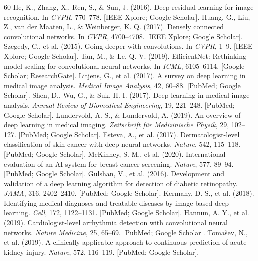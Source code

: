 \documentclass[10pt,a4paper]{article}
\begin{document}
\begin{thebibliography}{60}
 He, K., Zhang, X., Ren, S., \& Sun, J. (2016). Deep residual learning for image recognition. In \textit{CVPR}, 770--778. [IEEE Xplore; Google Scholar].
 Huang, G., Liu, Z., van der Maaten, L., \& Weinberger, K. Q. (2017). Densely connected convolutional networks. In \textit{CVPR}, 4700--4708. [IEEE Xplore; Google Scholar].
 Szegedy, C., et al. (2015). Going deeper with convolutions. In \textit{CVPR}, 1--9. [IEEE Xplore; Google Scholar].
 Tan, M., \& Le, Q. V. (2019). EfficientNet: Rethinking model scaling for convolutional neural networks. In \textit{ICML}, 6105--6114. [Google Scholar; ResearchGate].
 Litjens, G., et al. (2017). A survey on deep learning in medical image analysis. \textit{Medical Image Analysis}, 42, 60--88. [PubMed; Google Scholar].
 Shen, D., Wu, G., \& Suk, H.-I. (2017). Deep learning in medical image analysis. \textit{Annual Review of Biomedical Engineering}, 19, 221--248. [PubMed; Google Scholar].
 Lundervold, A. S., \& Lundervold, A. (2019). An overview of deep learning in medical imaging. \textit{Zeitschrift für Medizinische Physik}, 29, 102--127. [PubMed; Google Scholar].
 Esteva, A., et al. (2017). Dermatologist-level classification of skin cancer with deep neural networks. \textit{Nature}, 542, 115--118. [PubMed; Google Scholar].
 McKinney, S. M., et al. (2020). International evaluation of an AI system for breast cancer screening. \textit{Nature}, 577, 89--94. [PubMed; Google Scholar].
 Gulshan, V., et al. (2016). Development and validation of a deep learning algorithm for detection of diabetic retinopathy. \textit{JAMA}, 316, 2402--2410. [PubMed; Google Scholar].
 Kermany, D. S., et al. (2018). Identifying medical diagnoses and treatable diseases by image-based deep learning. \textit{Cell}, 172, 1122--1131. [PubMed; Google Scholar].
 Hannun, A. Y., et al. (2019). Cardiologist-level arrhythmia detection with convolutional neural networks. \textit{Nature Medicine}, 25, 65--69. [PubMed; Google Scholar].
 Tomašev, N., et al. (2019). A clinically applicable approach to continuous prediction of acute kidney injury. \textit{Nature}, 572, 116--119. [PubMed; Google Scholar].

\end{thebibliography}
\end{document}
